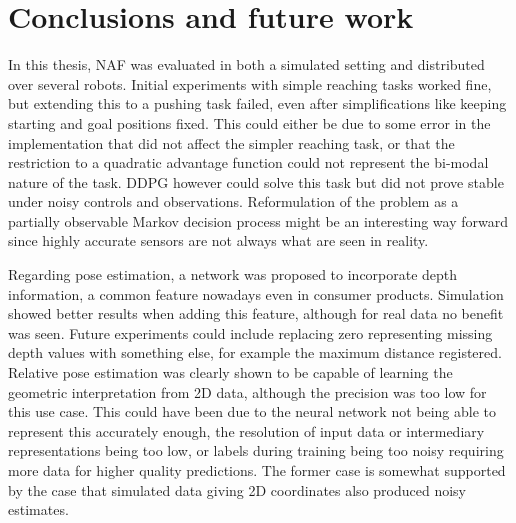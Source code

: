 \section{Conclusions and future work}

In this thesis, NAF was evaluated in both a simulated setting and distributed
over several robots. Initial experiments with simple reaching tasks worked
fine, but extending this to a pushing task failed, even after simplifications
like keeping starting and goal positions fixed. This could either be due to
some error in the implementation that did not affect the simpler reaching task,
or that the restriction to a quadratic advantage function could not represent
the bi-modal nature of the task. DDPG however could solve this task but did not
prove stable under noisy controls and observations. Reformulation of the
problem as a partially observable Markov decision process might be an
interesting way forward since highly accurate sensors are not always what are
seen in reality.

Regarding pose estimation, a network was proposed to incorporate depth
information, a common feature nowadays even in consumer products. Simulation
showed better results when adding this feature, although for real data no
benefit was seen. Future experiments could include replacing zero representing
missing depth values with something else, for example the maximum distance
registered. Relative pose estimation was clearly shown to be capable of
learning the geometric interpretation from 2D data, although the precision was
too low for this use case. This could have been due to the neural network not
being able to represent this accurately enough, the resolution of input data or
intermediary representations being too low, or labels during training being too
noisy requiring more data for higher quality predictions. The former case is
somewhat supported by the case that simulated data giving 2D coordinates also
produced noisy estimates.

